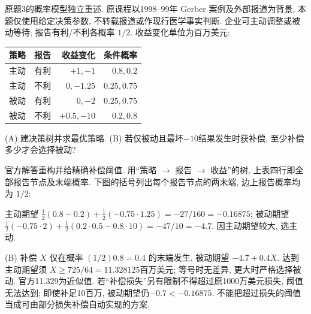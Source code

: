 \begin{exercise}\label{ass:15053-rec10-q3}
原题3的概率模型独立重述. 原课程以1998--99年 Gerber 案例及外部报道为背景, 本题仅使用给定决策参数, 不转载报道或作现行医学事实判断. 企业可主动调整或被动等待; 报告有利/不利各概率 $1/2$. 收益变化单位为百万美元:
\begin{center}\begin{tabular}{c|c|rr}
策略&报告&收益变化&条件概率\\\hline
主动&有利&$+1,-1$&$0.8,0.2$\\
主动&不利&$0,-1.25$&$0.25,0.75$\\
被动&有利&$0,-2$&$0.25,0.75$\\
被动&不利&$+0.5,-10$&$0.2,0.8$
\end{tabular}\end{center}
(A) 建决策树并求最优策略. (B) 若仅被动且最坏$-10$结果发生时获补偿, 至少补偿多少才会选择被动?
\end{exercise}
\begin{solution}
官方解答重构并给精确补偿阈值. 用“策略 $\to$ 报告 $\to$ 收益”的树, 上表四行即全部报告节点及末端概率. 下图的括号列出每个报告节点的两末端, 边上报告概率均为 $1/2$:
\begin{center}\end{center}
主动期望 $\tfrac12(0.8-0.2)+\tfrac12(-0.75\cdot1.25)=-27/160=-0.16875$; 被动期望 $\tfrac12(-0.75\cdot2)+\tfrac12(0.2\cdot0.5-0.8\cdot10)=-47/10=-4.7$. 因主动期望较大, 选主动.

(B) 补偿 $X$ 仅在概率 $(1/2)0.8=0.4$ 的末端发生, 被动期望 $-4.7+0.4X$. 达到主动期望须 $X\ge725/64=11.328125$百万美元; 等号时无差异, 更大时严格选择被动. 官方11.329为近似值. 若“补偿损失”另有限制不得超过原1000万美元损失, 阈值无法达到; 即使补足10百万, 被动期望仍$-0.7<-0.16875$. 不能把超过损失的阈值当成可由部分损失补偿自动实现的方案.
\end{solution}
